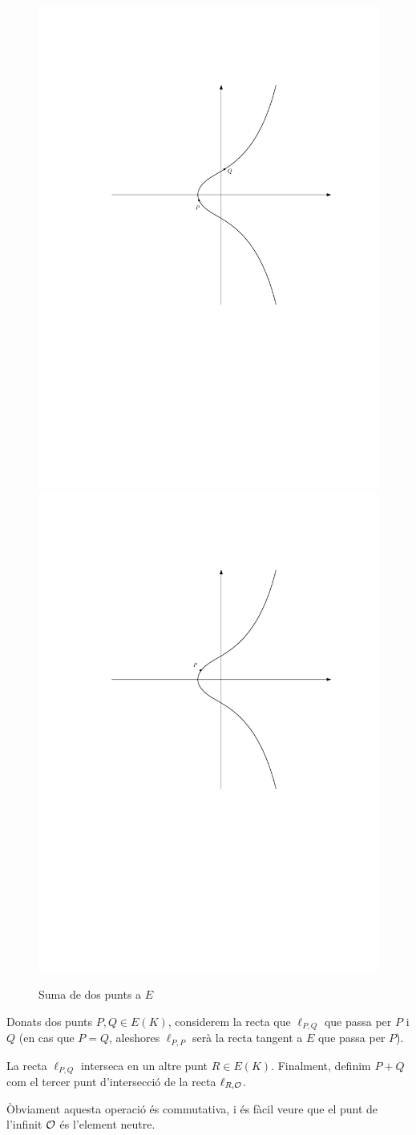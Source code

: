 \begin{figure}[ht]
\includegraphics[page=3,width=.5\textwidth]{addingpoints.pdf}
\includegraphics[page=3,width=.5\textwidth]{doublingpoints.pdf}
\caption{Suma de dos punts a $E$}
\end{figure}

Donats dos punts $P,Q \in E(K)$, considerem la recta que $\ell_{P,Q}$ que passa per $P$ i $Q$ (en cas que $P=Q$, aleshores $\ell_{P,P}$ serà la recta tangent a $E$ que passa per $P$).

La recta $\ell_{P,Q}$ interseca en un altre punt $R\in E(K)$. Finalment, definim $P+Q$ com el tercer punt d'intersecció de la recta $\ell_{R,\mathcal{O}}$.

Òbviament aquesta operació és commutativa, i és fàcil veure que el punt de l'infinit $\mathcal{O}$ és l'element neutre.

